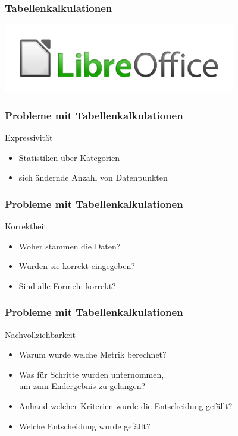 \documentclass{beamer}
\begin{document}
\begin{frame}
  \frametitle{Tabellenkalkulationen}
  \includegraphics[width=4in]{libreoffice-logo.png}
\end{frame}

\begin{frame}
  \frametitle{Probleme mit Tabellenkalkulationen}
  \begin{block}{Expressivit\"at}
    \begin{itemize}
    \item Statistiken \"uber Kategorien
    \item sich \"andernde Anzahl von Datenpunkten
    \end{itemize}
  \end{block}
\end{frame}

\begin{frame}
  \frametitle{Probleme mit Tabellenkalkulationen}
  \begin{block}{Korrektheit}
    \begin{itemize}
    \item Woher stammen die Daten?
    \item Wurden sie korrekt eingegeben?
    \item Sind alle Formeln korrekt?
    \end{itemize}
  \end{block}
\end{frame}

\begin{frame}
  \frametitle{Probleme mit Tabellenkalkulationen}
  \begin{block}{Nachvollziehbarkeit}
    \begin{itemize}
    \item Warum wurde welche Metrik berechnet?
    \item Was f\"ur Schritte wurden unternommen, \\ um zum Endergebnis zu gelangen?
    \item Anhand welcher Kriterien wurde die Entscheidung gef\"allt?
    \item Welche Entscheidung wurde gef\"allt?
    \end{itemize}
  \end{block}
\end{frame}
\end{document}
